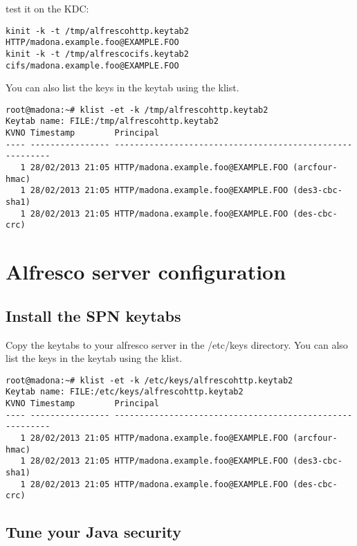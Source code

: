 \documentclass[12pt,a4]{article}
\begin{document}
test it on the KDC:
\begin{verbatim}
kinit -k -t /tmp/alfrescohttp.keytab2 HTTP/madona.example.foo@EXAMPLE.FOO
kinit -k -t /tmp/alfrescocifs.keytab2 cifs/madona.example.foo@EXAMPLE.FOO
\end{verbatim}
You can also list the keys in the keytab using the klist.
\begin{verbatim}
root@madona:~# klist -et -k /tmp/alfrescohttp.keytab2
Keytab name: FILE:/tmp/alfrescohttp.keytab2
KVNO Timestamp        Principal
---- ---------------- ---------------------------------------------------------
   1 28/02/2013 21:05 HTTP/madona.example.foo@EXAMPLE.FOO (arcfour-hmac) 
   1 28/02/2013 21:05 HTTP/madona.example.foo@EXAMPLE.FOO (des3-cbc-sha1) 
   1 28/02/2013 21:05 HTTP/madona.example.foo@EXAMPLE.FOO (des-cbc-crc) 
\end{verbatim}

\section{Alfresco server configuration}
\subsection{Install the SPN keytabs}
Copy the keytabs to your alfresco server in the /etc/keys directory.
You can also list the keys in the keytab using the klist.
\begin{verbatim}
root@madona:~# klist -et -k /etc/keys/alfrescohttp.keytab2
Keytab name: FILE:/etc/keys/alfrescohttp.keytab2
KVNO Timestamp        Principal
---- ---------------- ---------------------------------------------------------
   1 28/02/2013 21:05 HTTP/madona.example.foo@EXAMPLE.FOO (arcfour-hmac) 
   1 28/02/2013 21:05 HTTP/madona.example.foo@EXAMPLE.FOO (des3-cbc-sha1) 
   1 28/02/2013 21:05 HTTP/madona.example.foo@EXAMPLE.FOO (des-cbc-crc) 
\end{verbatim}

\subsection{Tune your Java security}
\end{document}
